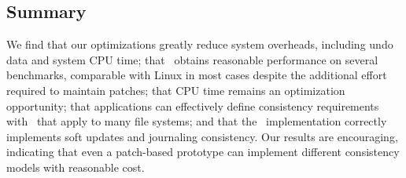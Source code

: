 \subsection{Summary}
\label{sec:evaluation:summary}

We find
%
that our optimizations greatly reduce system overheads, including
undo data and system CPU time;
%
that \Kudos\ obtains reasonable performance on several benchmarks,
comparable with Linux in most cases despite the additional effort required
to maintain patches;
%
that CPU time remains an optimization opportunity;
%
that applications can effectively define consistency requirements with
\patchgroups\ that apply to many file systems;
%
and that the \Kudos\ implementation correctly
implements soft updates and journaling consistency.
%
Our results are encouraging, indicating that even a patch-based prototype
can implement different consistency models with reasonable cost.
